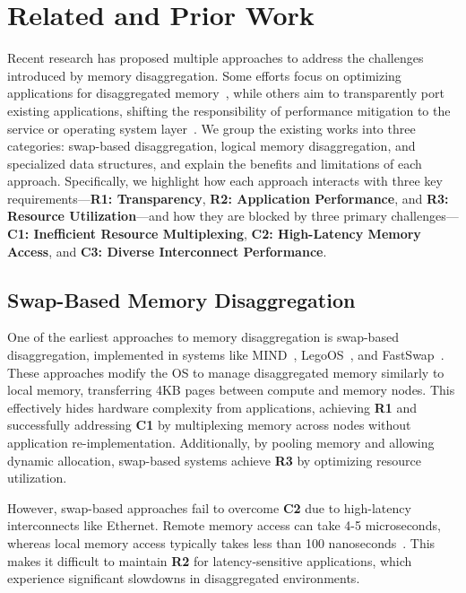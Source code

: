 \chapter{Related and Prior Work}

Recent research has proposed multiple approaches to address the challenges introduced by memory disaggregation. Some efforts focus on optimizing applications for disaggregated memory~\cite{farm, aifm, sherman, existing1}, while others aim to transparently port existing applications, shifting the responsibility of performance mitigation to the service or operating system layer~\cite{mind, legoos, fastswap, infiniswap, runtime1, runtime2}. We group the existing works into three categories: swap-based disaggregation, logical memory disaggregation, and specialized data structures, and explain the benefits and limitations of each approach. Specifically, we highlight how each approach interacts with three key requirements—\textbf{R1: Transparency}, \textbf{R2: Application Performance}, and \textbf{R3: Resource Utilization}—and how they are blocked by three primary challenges—\textbf{C1: Inefficient Resource Multiplexing}, \textbf{C2: High-Latency Memory Access}, and \textbf{C3: Diverse Interconnect Performance}.

\section{Swap-Based Memory Disaggregation}

One of the earliest approaches to memory disaggregation is swap-based disaggregation, implemented in systems like MIND~\cite{mind}, LegoOS~\cite{legoos}, and FastSwap~\cite{fastswap}. These approaches modify the OS to manage disaggregated memory similarly to local memory, transferring 4KB pages between compute and memory nodes. This effectively hides hardware complexity from applications, achieving \textbf{R1} and successfully addressing \textbf{C1} by multiplexing memory across nodes without application re-implementation. Additionally, by pooling memory and allowing dynamic allocation, swap-based systems achieve \textbf{R3} by optimizing resource utilization.

However, swap-based approaches fail to overcome \textbf{C2} due to high-latency interconnects like Ethernet. Remote memory access can take 4-5 microseconds, whereas local memory access typically takes less than 100 nanoseconds~\cite{cxl1, mind}. This makes it difficult to maintain \textbf{R2} for latency-sensitive applications, which experience significant slowdowns in disaggregated environments.

